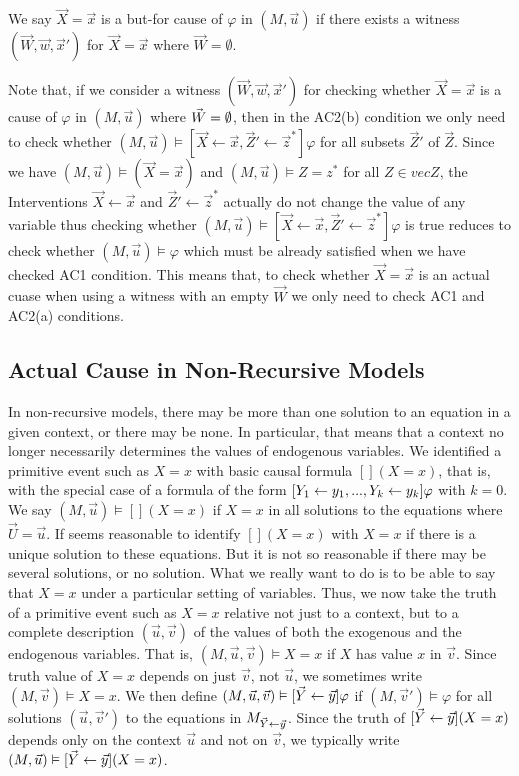 \begin{definition}
    We say $\vec X = \vec x$ is a but-for cause of $\varphi$ in
    $(M,\vec u)$ if there exists a witness $(\vec W, \vec w, \vec x')$
    for $\vec X = \vec x$ where $\vec W = \emptyset $.
\end{definition}

Note that, if we consider a witness $(\vec W, \vec w, \vec x')$
for checking whether $\vec X = \vec x$ is a cause of $\varphi$
in $(M,\vec u)$ where $\vec W = \emptyset$, then in the AC2(b) condition
we only need to check whether $(M,\vec u) \vDash [\vec X \leftarrow \vec x, \vec Z' \leftarrow \vec z^*]\varphi$ for all subsets $\vec Z'$
of $\vec Z$.
Since we have $(M,\vec u) \vDash (\vec X = \vec x)$ and
$(M,\vec u) \vDash Z = z^*$ for all $Z \in vec Z$,
the Interventions $\vec X \leftarrow \vec x$ and
$\vec Z ' \leftarrow \vec z^*$ actually do not change the value of
any variable thus checking whether
$(M,\vec u) \vDash [\vec X \leftarrow \vec x, \vec Z' \leftarrow \vec z^*]\varphi$ is true
reduces to check whether $(M,\vec u) \vDash \varphi$
which must be already satisfied when we have checked AC1 condition.
This means that, to check whether $\vec X = \vec x$ is an actual cuase when using a witness with an empty $\vec W$
we only need to check AC1 and AC2(a) conditions.

\subsection{Actual Cause in Non-Recursive Models}

In non-recursive models, there may be more than one solution to
an equation in a given context, or there may be none.
In particular, that means that a context no longer necessarily
determines the values of endogenous variables.
We identified a primitive event such as $X = x$ with basic causal formula $[](X=x)$, that is, with the special case of a formula
of the form $[Y_1 \leftarrow y_1,...,Y_k\leftarrow y_k ]\varphi$ with $k =0 $.
We say $(M,\vec u) \vDash [] (X = x)$ if $X=x$ in all solutions
to the equations where $\vec U = \vec u$.
If seems reasonable to identify $[](X=x)$ with $X=x$ if there
is a unique solution to these equations.
But it is not so reasonable if there may be several solutions,
or no solution.
What we really want to do is to be able to say that $X=x$ under
a particular setting of variables.
Thus, we now take the truth of a primitive event such as $X=x$
relative not just to a context, but to a complete description
$(\vec u, \vec v)$ of the values of both the exogenous and
the endogenous variables.
That is, $(M,\vec u,\vec v) \vDash X =x$ if $X$ has value $x$ in $\vec v$.
Since truth value of $X=x$ depends on just $\vec v$, not $\vec u$,
we sometimes write $(M,\vec v) \vDash X =x$.
We then define $(M,\vec u, \vec v) \vDash[\vec Y \leftarrow \vec y]\varphi$ if $(M,\vec v') \vDash \varphi$ for all solutions
$(\vec u, \vec v')$ to the equations in $M_{\vec Y \leftarrow \vec y}$.
Since the truth of $[\vec Y \leftarrow \vec y](X=x)$ depends only on the
context $\vec u$ and not on $\vec v$, we typically write $(M,\vec u) \vDash[ \vec Y \leftarrow \vec y](X=x)$.

